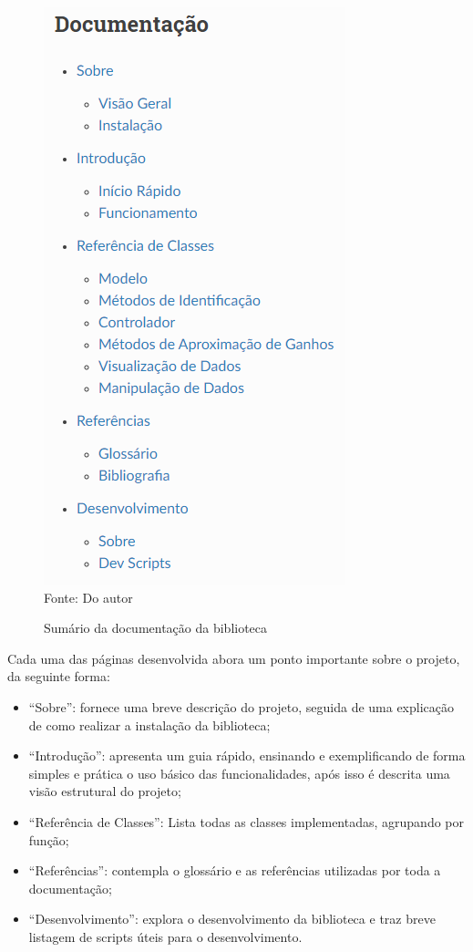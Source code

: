 \begin{figure}[H]
    \centering
    \caption{Sumário da documentação da biblioteca}
    \includegraphics[scale=0.6]{figuras/doc_summary}
    \label{fig:doc_summary}
    \\
    \vspace{0cm}\hspace{0cm}\small{Fonte: Do autor}
\end{figure}

Cada uma das páginas desenvolvida abora um ponto importante sobre o projeto, da seguinte forma:
\begin{itemize}
    \item ``Sobre'': fornece uma breve descrição do projeto, seguida de uma explicação de como realizar a instalação da
    biblioteca;
    \item ``Introdução'': apresenta um guia rápido, ensinando e exemplificando de forma simples e prática o uso básico das
    funcionalidades, após isso é descrita uma visão estrutural do projeto;
    \item ``Referência de Classes'': Lista todas as classes implementadas, agrupando por função;
    \item ``Referências'': contempla o glossário e as referências utilizadas por toda a documentação;
    \item ``Desenvolvimento'': explora o desenvolvimento da biblioteca e traz breve listagem de scripts úteis para
    o desenvolvimento.
\end{itemize}


